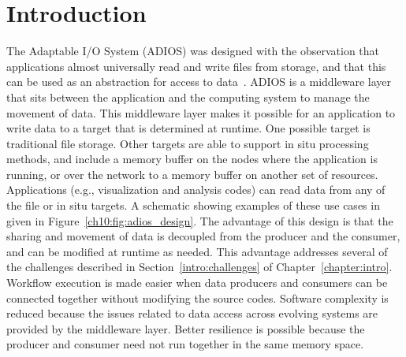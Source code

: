 \documentclass[x11names,table,xcdraw,graybox]{svmult}
\begin{document}
%
%
%

\section{Introduction}


The Adaptable I/O System (ADIOS) was designed with the observation that applications almost universally read and write files from storage, and that this can be used as an abstraction for access to data~\cite{godoy2020}. ADIOS is a middleware layer that sits between the application and the computing system to manage the movement of data. This middleware layer makes it possible for an application to write data to a target that is determined at runtime. One possible target is traditional file storage.
Other targets are able to support in situ processing methods, and include a memory buffer on the nodes where the application is running, or over the network to a memory buffer on another set of resources. Applications (e.g., visualization and analysis codes) can read data from any of the file or in situ targets. A schematic showing examples of these use cases in given in Figure~\ref{ch10:fig:adios_design}.  The advantage of this design is that the sharing and movement of data is decoupled from the producer and the consumer, and can be modified at runtime as needed. This advantage addresses several of the challenges described in Section~\ref{intro:challenges} of Chapter~\ref{chapter:intro}. Workflow execution is made easier when data producers and consumers can be connected together without modifying the source codes. Software complexity is reduced because the issues related to data access across evolving systems are provided by the middleware layer. Better resilience is possible because the producer and consumer need not run together in the same memory space.
\end{document}

